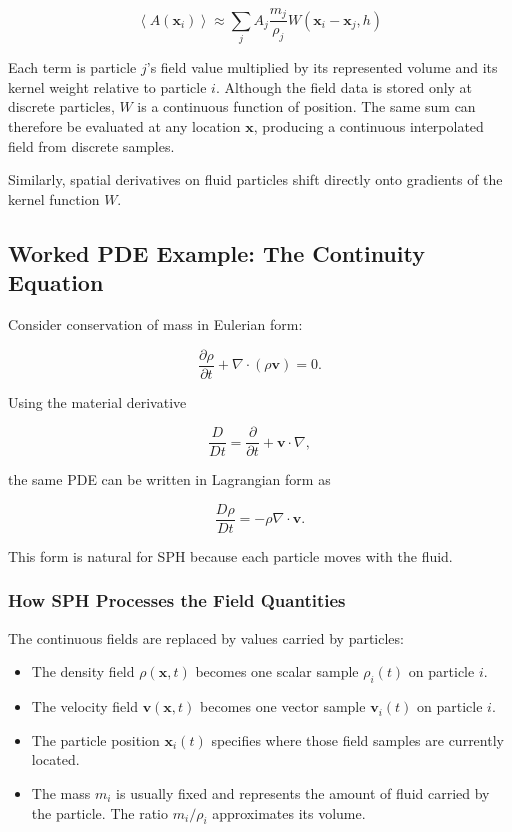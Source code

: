 \documentclass[11pt]{article}
\begin{document}
\begin{equation}
    \left\langle A(\mathbf{x}_i) \right\rangle
    \approx \sum_j A_j \frac{m_j}{\rho_j}
    W(\mathbf{x}_i - \mathbf{x}_j, h)
\end{equation}

Each term is particle $j$'s field value multiplied by its represented volume
and its kernel weight relative to particle $i$. Although the field data is
stored only at discrete particles, $W$ is a continuous function of position.
The same sum can therefore be evaluated at any location $\mathbf{x}$, producing
a continuous interpolated field from discrete samples.

Similarly, spatial derivatives on fluid particles shift directly onto
gradients of the kernel function $W$.

\subsection{Worked PDE Example: The Continuity Equation}

Consider conservation of mass in Eulerian form:

\begin{equation}
    \frac{\partial \rho}{\partial t}
    + \nabla\cdot(\rho\mathbf{v}) = 0.
\end{equation}

Using the material derivative

\begin{equation}
    \frac{D}{Dt}
    = \frac{\partial}{\partial t} + \mathbf{v}\cdot\nabla,
\end{equation}

the same PDE can be written in Lagrangian form as

\begin{equation}
    \frac{D\rho}{Dt} = -\rho\nabla\cdot\mathbf{v}.
\end{equation}

This form is natural for SPH because each particle moves with the fluid.

\subsubsection{How SPH Processes the Field Quantities}

The continuous fields are replaced by values carried by particles:

\begin{itemize}
    \item The density field $\rho(\mathbf{x},t)$ becomes one scalar sample
    $\rho_i(t)$ on particle $i$.
    \item The velocity field $\mathbf{v}(\mathbf{x},t)$ becomes one vector
    sample $\mathbf{v}_i(t)$ on particle $i$.
    \item The particle position $\mathbf{x}_i(t)$ specifies where those field
    samples are currently located.
    \item The mass $m_i$ is usually fixed and represents the amount of fluid
    carried by the particle. The ratio $m_i/\rho_i$ approximates its volume.
\end{itemize}
\end{document}
